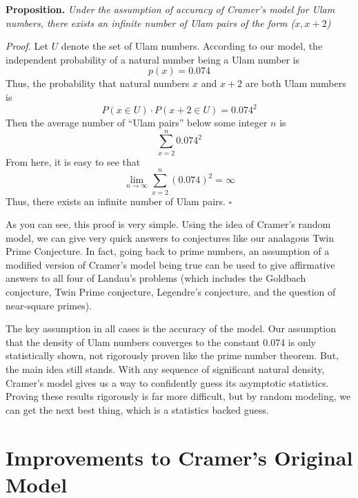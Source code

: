 \documentclass[conference]{IEEEtran}
\begin{document}
\medskip\noindent
\textbf{Proposition.} \textit{Under the assumption of accuracy of Cramer's model for Ulam numbers, there exists an infinite number of Ulam pairs of the form ($x, x + 2$)} 

\smallskip\noindent
\textit{Proof.} Let $U$ denote the set of Ulam numbers. According to our model, the independent probability of a natural number being a Ulam number is
    \[p(x) = 0.074\]
Thus, the probability that natural numbers $x$ and $x + 2$ are both Ulam numbers is
    \[P(x \in U) \cdot P(x + 2 \in U) = 0.074^2\]
Then the average number of ``Ulam pairs'' below some integer $n$ is
\[\sum_{x = 2}^{n}0.074^2\]
From here, it is easy to see that
\[\lim_{n\rightarrow \infty} \sum_{x = 2}^{n}(0.074)^2 = \infty\]
Thus, there exists an infinite number of Ulam pairs.
\hfill$\square$\medskip

As you can see, this proof is very simple. Using the idea of Cramer's random model, we can give very quick answers to conjectures like our analagous Twin Prime Conjecture. In fact, going back to prime numbers, an assumption of a modified version of Cramer's model being true can be used to give affirmative answers to all four of Landau's problems \cite{b1} (which includes the Goldbach conjecture, Twin Prime conjecture, Legendre's conjecture, and the question of near-square primes).

The key assumption in all cases is the accuracy of the model. Our assumption that the density of Ulam numbers converges to the constant 0.074 is only statistically shown, not rigorously proven like the prime number theorem. But, the main idea still stands. With any sequence of significant natural density, Cramer's model gives us a way to confidently guess its asymptotic statistics. Proving these results rigorously is far more difficult, but by random modeling, we can get the next best thing, which is a statistics backed guess. 

\section{Improvements to Cramer's Original Model}
\end{document}
